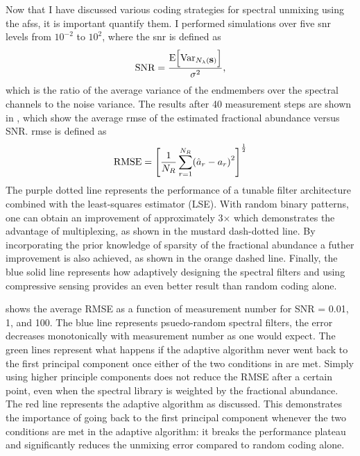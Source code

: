 Now that I have discussed various coding strategies for spectral unmixing using the \gls{afss}, it is important quantify  them. I performed simulations over five \gls{snr} levels from $10^{-2}$ to $10^2$, where the \gls{snr} is defined as 
%
\begin{equation}
	\text{SNR} = \frac{ \text{E} \Big[ \text{Var}_{N_{\lambda}  \ap{ \mb{s} } } \Big] }{\sigma^2},
\end{equation}
%
which is the ratio of the average variance of the endmembers over the spectral channels to the noise variance. The results after 40 measurement steps are shown in , which show the average \acrfull{rmse} of the estimated fractional abundance versus SNR. \gls{rmse} is defined as 
%
\begin{equation}
	\text{RMSE} =  \left[ \frac{1}{N_R} \sum_{r = 1}^{N_{R}} \ap{ \hat{a}_r - a_r }^2 \right]^{\frac{1}{2}}
\end{equation}
%
The purple dotted line represents the performance of a tunable filter architecture combined with the least-squares estimator (LSE). With random binary patterns, one can obtain an improvement of approximately 3$\times$ which demonstrates the advantage of multiplexing, as shown in the mustard dash-dotted line. By incorporating the prior knowledge of sparsity of the fractional abundance a futher improvement is also achieved, as shown in the orange dashed line. Finally, the blue solid line represents how adaptively designing the spectral filters and using compressive sensing provides an even better result than random coding alone. 

 shows the average RMSE as a function of measurement number for SNR = 0.01, 1, and 100. The blue line represents psuedo-random spectral filters, the error decreases monotonically with measurement number as one would expect. The green lines represent what happens if the adaptive algorithm never went back to the first principal component once either of the two conditions in  are met. Simply using higher principle components does not reduce the RMSE after a certain point, even when the spectral library is weighted by the fractional abundance. The red line represents the adaptive algorithm as discussed. This demonstrates the importance of going back to the first principal component whenever the two conditions are met in the adaptive algorithm: it breaks the performance plateau and significantly reduces the unmixing error compared to random coding alone.

